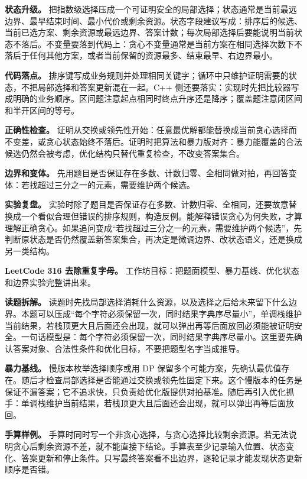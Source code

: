 \textbf{状态升级。} 把指数级选择压成一个可证明安全的局部选择；状态通常是当前最远边界、最早结束时间、最小代价或剩余资源。状态字段建议写成：排序后的候选、当前已选方案、剩余资源或最远边界、答案计数；每次局部选择后要能说明当前状态不落后。不变量要落到代码上：贪心不变量通常是当前方案在相同选择次数下不落后于任何其他方案，或者当前保留的资源最多、结束最早、右边界最小。

\textbf{代码落点。} 排序键写成业务规则并处理相同关键字；循环中只维护证明需要的状态，不把局部选择和答案更新混在一起。C++ 侧还要落实：实现时先把比较器写成明确的业务顺序。区间题注意起点相同时终点升序还是降序；覆盖题注意闭区间和半开区间的等号。

\textbf{正确性检查。} 证明从交换或领先性开始：任意最优解都能替换成当前贪心选择而不变差，或贪心状态始终不落后。证明时把算法和暴力版对齐：暴力能覆盖的合法候选仍然会被考虑，优化结构只替代重复检查，不改变答案集合。

\textbf{边界和变体。} 先用题目是否保证存在多数、计数归零、全相同做对拍，再回答变体：若找超过三分之一的元素，需要维护两个候选。

\textbf{实验复盘。} 实验时除了题目是否保证存在多数、计数归零、全相同，还要故意替换成一个看似合理但错误的排序规则，构造反例。能解释错误贪心为何失败，才算理解正确贪心。如果追问变成“若找超过三分之一的元素，需要维护两个候选”，先判断原状态是否仍然覆盖新答案集合，再决定是微调边界、改状态语义，还是换成另一类结构。

\noindent\textbf{LeetCode 316 去除重复字母。} 工作坊目标：把题面模型、暴力基线、优化状态和边界实验完整讲出来。

\textbf{读题拆解。} 读题时先找局部选择消耗什么资源，以及选择之后给未来留下什么边界。本题可以压成“每个字符必须保留一次，同时结果字典序尽量小”，单调栈维护当前结果，若栈顶更大且后面还会出现，就可以弹出再等后面放回必须能被证明安全。一句话模型是：每个字符必须保留一次，同时结果字典序尽量小。这里要先确认答案对象、合法性条件和优化目标，不要把题型名字当成推导。

\textbf{暴力基线。} 慢版本枚举选择顺序或用 DP 保留多个可能方案，先确认最优值存在。随后才检查局部选择是否能通过交换或领先性固定下来。这个慢版本的任务是保证不漏答案；它不追求快，只负责给优化版提供对拍基准。随后再引入优化抓手：单调栈维护当前结果，若栈顶更大且后面还会出现，就可以弹出再等后面放回。

\textbf{手算样例。} 手算时同时写一个非贪心选择，与贪心选择比较剩余资源。若无法说明贪心后剩余资源不差，就不能直接下结论。手算表至少记录输入位置、状态变化、答案更新和停止条件。只写最终答案看不出边界，逐轮记录才能发现状态更新顺序是否错。


